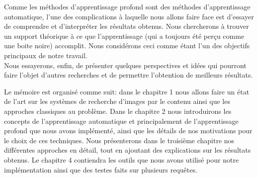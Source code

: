 	Comme les méthodes d’apprentissage profond sont des méthodes d'apprentissage automatique, l'une des complications à laquelle nous allons faire face est d'essayer de comprendre et d'interpréter les résultats obtenus. Nous chercherons à trouver un support théorique à ce que l'apprentissage (qui a toujours été perçu comme une boite noire) accomplit. Nous considérons ceci comme étant l'un des objectifs principaux de notre travail.\\


	Nous essayerons, enfin, de présenter quelques perspectives et idées qui pourront faire l'objet d'autres recherches et de permettre l'obtention de meilleurs résultats.

	Le mémoire est organisé comme suit: dans le chapitre 1 nous allons faire un état de l'art sur les systèmes de recherche d'images par le contenu ainsi que les approches classiques au problème. Dans le chapitre 2 nous introduirons les concepts de l'apprentissage automatique et principalement de l'apprentissage profond que nous avons implémenté, ainsi que les détails de nos motivations pour le choix de ces techniques. Nous présenterons dans le troisième chapitre nos différentes approches en détail, tout en ajoutant des explications sur les résultats obtenus. Le chapitre 4 contiendra les outils que nous avons utilisé pour notre implémentation ainsi que des testes faits sur plusieurs requêtes.
